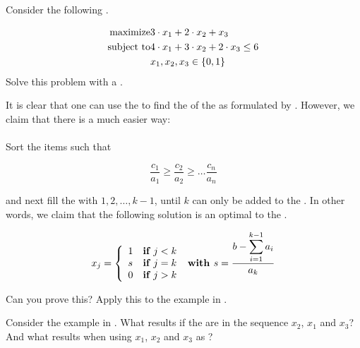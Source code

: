 \begin{exercise}
Consider the following .

\begin{eqnarray}
\mbox{maximize}&3\cdot x_1+2\cdot x_2+x_3\\
\mbox{subject to}&4\cdot x_1+3\cdot x_2+2\cdot x_3\leq6\\
&x_1,x_2,x_3\in\accl{0,1}
\end{eqnarray}
Solve this problem with a .
\end{exercise}

\begin{exercise}
It is clear that one can use the  to find the  of the  as formulated by . However, we claim that there is a much easier way:

\paragraph{}
Sort the items such that

\begin{equation}
\dfrac{c_1}{a_1}\geq\dfrac{c_2}{a_2}\geq\ldots\dfrac{c_n}{a_n}
\end{equation}


and next fill the  with  $1,2,\ldots,k-1$, until  $k$ can only be  added to the . In other words, we claim that the following solution is an optimal  to the .

\begin{equation}
x_j=\acclguard{
1&\xif j<k\\
s&\xif j=k\\
0&\xif j>k
}\xwith s=\dfrac{b-\sumieqb[i]{1}{k-1}{a_i}}{a_k}
\end{equation}

Can you prove this? Apply this to the example in .
\end{exercise}

\begin{exercise}
Consider the example in . What  results if the  are  in the sequence $x_2$, $x_1$ and $x_3$? And what  results when using $x_1$, $x_2$ and $x_3$ as ?
\end{exercise}